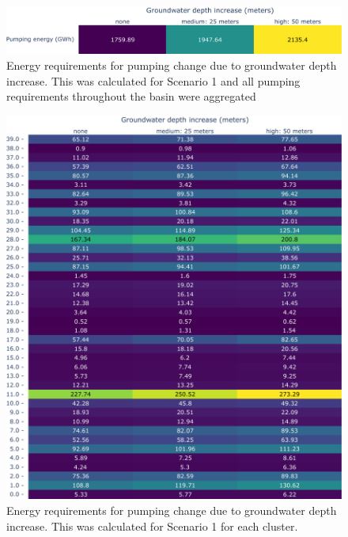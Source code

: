 \documentclass[12pt]{iopart}
\begin{document}
\begin{figure}[!h]
	\centering
	\includegraphics[width=\textwidth]{GWDSensitivityAll}
	\caption{Energy requirements for pumping change due to groundwater depth increase. This was calculated for Scenario 1 and all pumping requirements throughout the basin were aggregated}
	\label{fig:gwdsensall}
\end{figure} 
\newpage

\begin{figure}[!h]
	\centering
	\includegraphics[width=\textwidth]{GWDSensitivityClusters}
	\caption{Energy requirements for pumping change due to groundwater depth increase. This was calculated for Scenario 1 for each cluster.}
	\label{fig:gwdsensclusters}
\end{figure} 
\newpage
\end{document}
